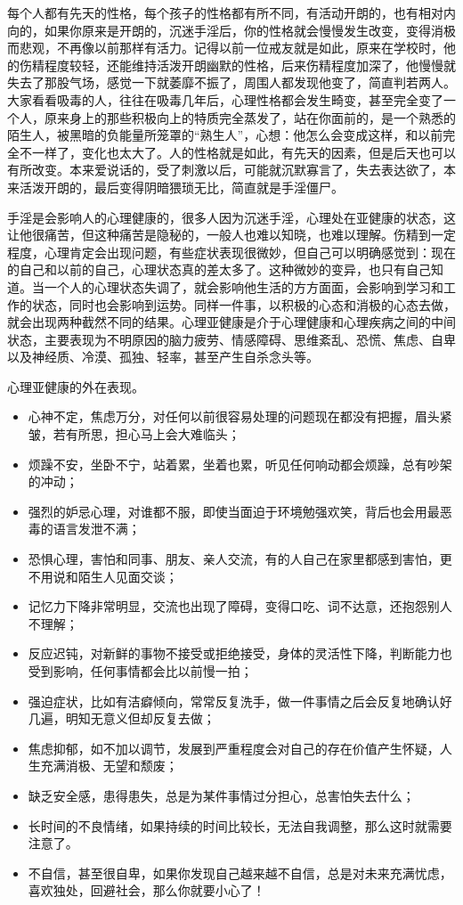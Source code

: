 每个人都有先天的性格，每个孩子的性格都有所不同，有活动开朗的，也有相对内向的，如果你原来是开朗的，沉迷手淫后，你的性格就会慢慢发生改变，变得消极而悲观，不再像以前那样有活力。记得以前一位戒友就是如此，原来在学校时，他的伤精程度较轻，还能维持活泼开朗幽默的性格，后来伤精程度加深了，他慢慢就失去了那股气场，感觉一下就萎靡不振了，周围人都发现他变了，简直判若两人。大家看看吸毒的人，往往在吸毒几年后，心理性格都会发生畸变，甚至完全变了一个人，原来身上的那些积极向上的特质完全蒸发了，站在你面前的，是一个熟悉的陌生人，被黑暗的负能量所笼罩的“熟生人”，心想：他怎么会变成这样，和以前完全不一样了，变化也太大了。人的性格就是如此，有先天的因素，但是后天也可以有所改变。本来爱说话的，受了刺激以后，可能就沉默寡言了，失去表达欲了，本来活泼开朗的，最后变得阴暗猥琐无比，简直就是手淫僵尸。

手淫是会影响人的心理健康的，很多人因为沉迷手淫，心理处在亚健康的状态，这让他很痛苦，但这种痛苦是隐秘的，一般人也难以知晓，也难以理解。伤精到一定程度，心理肯定会出现问题，有些症状表现很微妙，但自己可以明确感觉到：现在的自己和以前的自己，心理状态真的差太多了。这种微妙的变异，也只有自己知道。当一个人的心理状态失调了，就会影响他生活的方方面面，会影响到学习和工作的状态，同时也会影响到运势。同样一件事，以积极的心态和消极的心态去做，就会出现两种截然不同的结果。心理亚健康是介于心理健康和心理疾病之间的中间状态，主要表现为不明原因的脑力疲劳、情感障碍、思维紊乱、恐慌、焦虑、自卑以及神经质、冷漠、孤独、轻率，甚至产生自杀念头等。

心理亚健康的外在表现。

\begin{multicols}{2}
    \begin{itemize}
        \item 心神不定，焦虑万分，对任何以前很容易处理的问题现在都没有把握，眉头紧皱，若有所思，担心马上会大难临头；
        \item 烦躁不安，坐卧不宁，站着累，坐着也累，听见任何响动都会烦躁，总有吵架的冲动；
        \item 强烈的妒忌心理，对谁都不服，即使当面迫于环境勉强欢笑，背后也会用最恶毒的语言发泄不满；
        \item 恐惧心理，害怕和同事、朋友、亲人交流，有的人自己在家里都感到害怕，更不用说和陌生人见面交谈；
        \item 记忆力下降非常明显，交流也出现了障碍，变得口吃、词不达意，还抱怨别人不理解；
        \item 反应迟钝，对新鲜的事物不接受或拒绝接受，身体的灵活性下降，判断能力也受到影响，任何事情都会比以前慢一拍；
        \item 强迫症状，比如有洁癖倾向，常常反复洗手，做一件事情之后会反复地确认好几遍，明知无意义但却反复去做；
        \item 焦虑抑郁，如不加以调节，发展到严重程度会对自己的存在价值产生怀疑，人生充满消极、无望和颓废；
        \item 缺乏安全感，患得患失，总是为某件事情过分担心，总害怕失去什么；
        \item 长时间的不良情绪，如果持续的时间比较长，无法自我调整，那么这时就需要注意了。
        \item 不自信，甚至很自卑，如果你发现自己越来越不自信，总是对未来充满忧虑，喜欢独处，回避社会，那么你就要小心了！
    \end{itemize}
\end{multicols}

